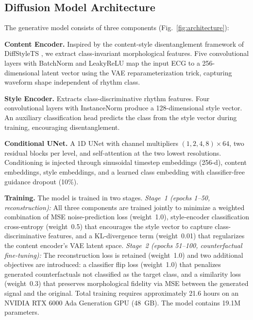 \documentclass[conference]{IEEEtran}
\begin{document}
\subsection{Diffusion Model Architecture}

The generative model consists of three components (Fig.~\ref{fig:architecture}):

\textbf{Content Encoder.} Inspired by the content-style disentanglement framework of DiffStyleTS \cite{nagda2025diffstylts}, we extract class-invariant morphological features. Five convolutional layers with BatchNorm and LeakyReLU map the input ECG to a 256-dimensional latent vector using the VAE reparameterization trick, capturing waveform shape independent of rhythm class.

\textbf{Style Encoder.} Extracts class-discriminative rhythm features. Four convolutional layers with InstanceNorm produce a 128-dimensional style vector. An auxiliary classification head predicts the class from the style vector during training, encouraging disentanglement.

\textbf{Conditional UNet.} A 1D UNet with channel multipliers $(1, 2, 4, 8) \times 64$, two residual blocks per level, and self-attention at the two lowest resolutions. Conditioning is injected through sinusoidal timestep embeddings (256-d), content embeddings, style embeddings, and a learned class embedding with classifier-free guidance dropout (10\%).

\textbf{Training.} The model is trained in two stages. \textit{Stage~1 (epochs 1--50, reconstruction):} All three components are trained jointly to minimize a weighted combination of MSE noise-prediction loss (weight~1.0), style-encoder classification cross-entropy (weight~0.5) that encourages the style vector to capture class-discriminative features, and a KL-divergence term (weight~0.01) that regularizes the content encoder's VAE latent space. \textit{Stage~2 (epochs 51--100, counterfactual fine-tuning):} The reconstruction loss is retained (weight~1.0) and two additional objectives are introduced: a classifier flip loss (weight~1.0) that penalizes generated counterfactuals not classified as the target class, and a similarity loss (weight~0.3) that preserves morphological fidelity via MSE between the generated signal and the original. Total training requires approximately 21.6 hours on an NVIDIA RTX 6000 Ada Generation GPU (48~GB). The model contains 19.1M parameters.
\end{document}
